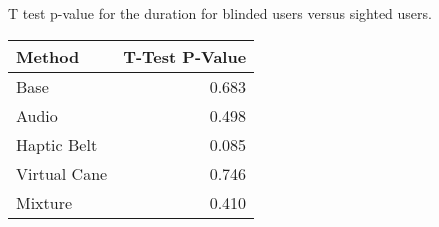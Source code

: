 
\centering
\caption{T test p-value for the duration for blinded users versus sighted users.}
\label{tab:ttest_duration}
\begin{tabular}{lr}
\toprule
      Method &  T-Test P-Value \\
\midrule
        Base &           0.683 \\
       Audio &           0.498 \\
 Haptic Belt &           0.085 \\
Virtual Cane &           0.746 \\
     Mixture &           0.410 \\
\bottomrule
\end{tabular}
